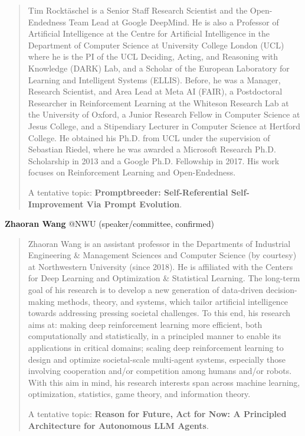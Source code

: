 \documentclass[10pt]{article} %
\begin{document}
\begin{quote}
    Tim Rocktäschel is a Senior Staff Research Scientist and the Open-Endedness Team Lead at Google DeepMind. He is also a Professor of Artificial Intelligence at the Centre for Artificial Intelligence in the Department of Computer Science at University College London (UCL) where he is the PI of the UCL Deciding, Acting, and Reasoning with Knowledge (DARK) Lab, and a Scholar of the European Laboratory for Learning and Intelligent Systems (ELLIS). Before, he was a Manager, Research Scientist, and Area Lead at Meta AI (FAIR), a Postdoctoral Researcher in Reinforcement Learning at the Whiteson Research Lab at the University of Oxford, a Junior Research Fellow in Computer Science at Jesus College, and a Stipendiary Lecturer in Computer Science at Hertford College. He obtained his Ph.D. from UCL under the supervision of Sebastian Riedel, where he was awarded a Microsoft Research Ph.D. Scholarship in 2013 and a Google Ph.D. Fellowship in 2017. His work focuses on Reinforcement Learning and Open-Endedness. 
  
    A tentative topic: {\bf Promptbreeder: Self-Referential Self-Improvement Via Prompt Evolution}.
\end{quote}



{\bf Zhaoran Wang} @NWU (speaker/committee, confirmed)  

\begin{quote}
    Zhaoran Wang is an assistant professor in the Departments of Industrial Engineering \& Management Sciences and Computer Science (by courtesy) at Northwestern University (since 2018). He is affiliated with the Centers for Deep Learning and Optimization \& Statistical Learning. The long-term goal of his research is to develop a new generation of data-driven decision-making methods, theory, and systems, which tailor artificial intelligence towards addressing pressing societal challenges. To this end, his research aims at: making deep reinforcement learning more efficient, both computationally and statistically, in a principled manner to enable its applications in critical domains; scaling deep reinforcement learning to design and optimize societal-scale multi-agent systems, especially those involving cooperation and/or competition among humans and/or robots. With this aim in mind, his research interests span across machine learning, optimization, statistics, game theory, and information theory.  

    A tentative topic: {\bf Reason for Future, Act for Now: A Principled Architecture for Autonomous LLM Agents}.
\end{quote}
\end{document}
